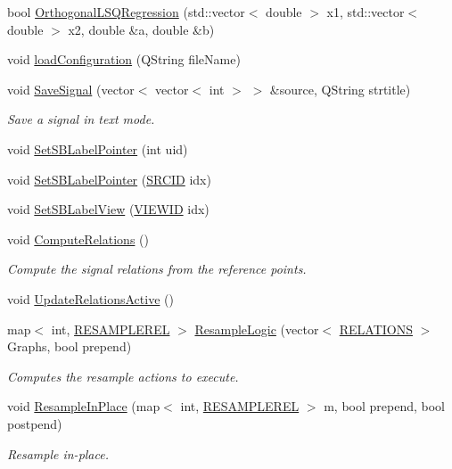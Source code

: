 \begin{CompactItemize}
bool \hyperlink{class_main_window_a9256553e6e0c80924a6777e4afa8971}{OrthogonalLSQRegression} (std::vector$<$ double $>$ x1, std::vector$<$ double $>$ x2, double \&a, double \&b)
\item 
void \hyperlink{class_main_window_592659d6abd1ead74cc8b711bedb1c46}{loadConfiguration} (QString fileName)
\item 
void \hyperlink{class_main_window_b4cc8338a8cb35f9fa06e503d9fa33e4}{SaveSignal} (vector$<$ vector$<$ int $>$ $>$ \&source, QString strtitle)
\begin{CompactList}\small\item\em Save a signal in text mode. \item\end{CompactList}\item 
void \hyperlink{class_main_window_dd0e786fcf14f5203608a58e980a8dca}{SetSBLabelPointer} (int uid)
\item 
void \hyperlink{class_main_window_cebfb5ac0494650a3126f3881902c67e}{SetSBLabelPointer} (\hyperlink{struct_s_r_c_i_d}{SRCID} idx)
\item 
void \hyperlink{class_main_window_6455b77419e64cce7982ca319fed3376}{SetSBLabelView} (\hyperlink{class_v_i_e_w_i_d}{VIEWID} idx)
\item 
void \hyperlink{class_main_window_a052e33dc4ba5663fe765cafb3d64c2d}{ComputeRelations} ()
\begin{CompactList}\small\item\em Compute the signal relations from the reference points. \item\end{CompactList}\item 
void \hyperlink{class_main_window_c22d079e4851b5c33f45b08b4f788892}{UpdateRelationsActive} ()
\item 
map$<$ int, \hyperlink{struct_r_e_s_a_m_p_l_e_r_e_l}{RESAMPLEREL} $>$ \hyperlink{class_main_window_11acf5df9e30701c181eef07283e7e9a}{ResampleLogic} (vector$<$ \hyperlink{data_8h_4b97445fb0d920ec53954c1420f3217c}{RELATIONS} $>$ Graphs, bool prepend)
\begin{CompactList}\small\item\em Computes the resample actions to execute. \item\end{CompactList}\item 
void \hyperlink{class_main_window_5b0b81d08ca239215d465b35a74236a7}{ResampleInPlace} (map$<$ int, \hyperlink{struct_r_e_s_a_m_p_l_e_r_e_l}{RESAMPLEREL} $>$ m, bool prepend, bool postpend)
\begin{CompactList}\small\item\em Resample in-place. \item\end{CompactList}\item 

\end{CompactItemize}
